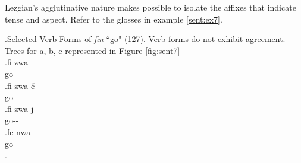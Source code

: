 Lezgian's agglutinative nature makes possible to isolate the affixes that indicate tense and aspect. Refer to the glosses in example \ref{sent:ex7}.

\ex.\label{sent:ex7}Selected Verb Forms of \textit{fin} ``go" (127). Verb forms do not exhibit agreement. Trees for a, b, c represented in Figure \ref{fig:sent7} \\
    \ag.fi-zwa \\
    go-\Impf[] \\
    \bg.fi-zwa-\v{c} \\
    go-\Impf[]-\Neg[] \\
    \cg.fi-zwa-j \\
    go-\Impf[]-\Pst[] \\
    \dg.fe-nwa \\
    go-\Prf[] \\
    \z.

